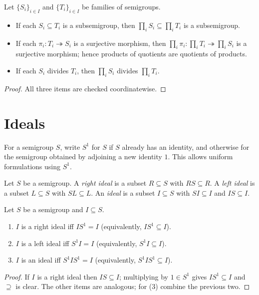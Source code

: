 \begin{lemma}
\label{lem:products-preserve-structure}
Let \(\{S_i\}_{i\in I}\) and \(\{T_i\}_{i\in I}\) be families of semigroups.
\begin{itemize}
  \item If each \(S_i\subseteq T_i\) is a subsemigroup, then \(\prod_i S_i\subseteq \prod_i T_i\) is a subsemigroup.
  \item If each \(\pi_i:T_i\twoheadrightarrow S_i\) is a surjective morphism, then \(\prod_i \pi_i:\prod_i T_i\twoheadrightarrow \prod_i S_i\) is a surjective morphism; hence products of quotients are quotients of products.
  \item If each \(S_i\) divides \(T_i\), then \(\prod_i S_i\) divides \(\prod_i T_i\).
\end{itemize}
\end{lemma}
\begin{proof}
All three items are checked coordinatewise.
\end{proof}


\section {Ideals}

For a semigroup \(S\), write \(S^1\) for \(S\) if \(S\) already has an identity, and otherwise for the semigroup obtained by adjoining a new identity \(1\). This allows uniform formulations using \(S^1\).

\begin{definition}
\label{def:ideal}
Let \(S\) be a semigroup. A \emph{right ideal} is a subset \(R\subseteq S\) with \(RS\subseteq R\). A \emph{left ideal} is a subset \(L\subseteq S\) with \(SL\subseteq L\). An \emph{ideal} is a subset \(I\subseteq S\) with \(SI\subseteq I\) and \(IS\subseteq I\).
\end{definition}

\begin{lemma}
\label{lem:ideal-characterization-semigroup}
Let \(S\) be a semigroup and \(I\subseteq S\).
\begin{enumerate}
  \item \(I\) is a right ideal iff \(I S^1=I\) (equivalently, \(I S^1\subseteq I\)).
  \item \(I\) is a left ideal iff \(S^1 I=I\) (equivalently, \(S^1 I\subseteq I\)).
  \item \(I\) is an ideal iff \(S^1 I S^1=I\) (equivalently, \(S^1 I S^1\subseteq I\)).
\end{enumerate}
\end{lemma}
\begin{proof}
If \(I\) is a right ideal then \(IS\subseteq I\); multiplying by \(1\in S^1\) gives \(IS^1\subseteq I\) and \(\supseteq\) is clear. The other items are analogous; for (3) combine the previous two.
\end{proof}

